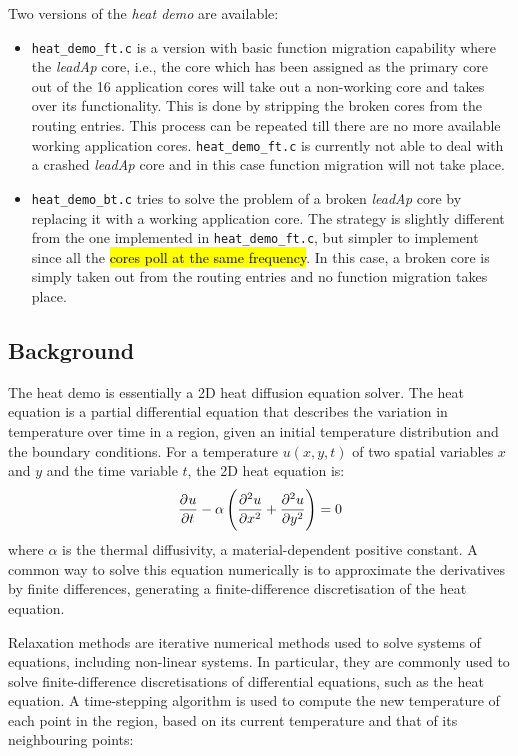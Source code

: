 \documentclass[a4paper, 11pt]{article}
\begin{document}
Two versions of the \emph{heat demo} are available:
\begin{itemize}
\item \verb|heat_demo_ft.c| is a version with basic function migration capability where the \emph{leadAp} core, i.e., the core which has been assigned as the primary core out of the 16 application cores will take out a non-working core and takes over its functionality. This is done by stripping the broken cores from the routing entries. This process can be repeated till there are no more available working application cores. \verb|heat_demo_ft.c| is currently not able to deal with a crashed \emph{leadAp} core and in this case function migration will not take place.

\item \verb|heat_demo_bt.c| tries to solve the problem of a broken \emph{leadAp} core by replacing it with a working application core. The strategy is slightly different from the one implemented in \verb|heat_demo_ft.c|, but simpler to implement since all the \hl{cores poll at the same frequency}. In this case, a broken core is simply taken out from the routing entries and no function migration takes place.
\end{itemize}

\subsection{Background}
The heat demo is essentially a 2D heat diffusion equation solver. The heat equation is a partial differential equation that describes the variation in temperature over time in a region, given an initial temperature distribution and the boundary conditions. For a temperature $u(x,y,t)$ of two spatial variables $x$ and $y$ and the time variable $t$, the 2D heat equation is:
\[
\dpd{u}{t} -\alpha\left( \dpd[2]{u}{x} + \dpd[2]{u}{y} \right) = 0 
\]
where $\alpha$ is the thermal diffusivity, a material-dependent positive constant. A common way to solve this equation numerically is to approximate the derivatives by finite differences, generating a finite-difference discretisation of the heat equation.

Relaxation methods are iterative numerical methods used to solve systems of equations, including non-linear systems. In particular, they are commonly used to solve finite-difference discretisations of differential equations, such as the heat equation. A time-stepping algorithm is used to compute the new temperature of each point in the region, based on its current temperature and that of its neighbouring points:
\end{document}
